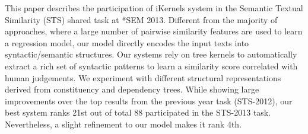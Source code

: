 This paper describes the participation of iKernels system in the Semantic Textual Similarity (STS) shared task at *SEM 2013. Different from the majority
 of approaches, where a large number of pairwise similarity features are used to
 learn a regression model, our model directly encodes the input texts into
 syntactic/semantic structures. Our systems rely on tree kernels to
 automatically extract a rich set of syntactic patterns to learn a similarity
 score correlated with human judgements. We experiment with different structural
 representations derived from constituency and dependency trees. While showing
 large improvements over the top results from the previous year task (STS-2012),
 our best system ranks 21st out of total 88 participated in the STS-2013 task.
 Nevertheless, a slight refinement to our model makes it rank 4th.

